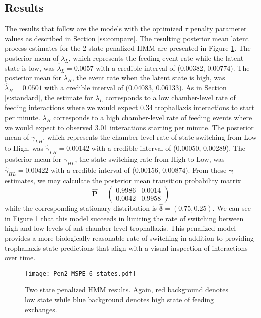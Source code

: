 \documentclass[smallextended]{svjour3}       %
\begin{document}
\subsection{Results}
The results that follow are the models with the optimized $\tau$ penalty parameter values as described in Section \ref{ss:compare}. The resulting posterior mean latent process estimates for the 2-state penalized HMM are presented in Figure \ref{f:penaltystates}. The posterior mean of $\lambda_L$, which represents the feeding event rate while the latent state is low, was $\hat{\lambda}_L = 0.0057$ with a credible interval of (0.00382, 0.00774). The posterior mean for $\lambda_H$, the event rate when the latent state is high, was $\hat{\lambda}_H = 0.0501$ with a credible interval of (0.04083, 0.06133). As in Section \ref{s:standard}, the estimate for $\lambda_L$ corresponds to a low chamber-level rate of feeding interactions where we would expect 0.34 trophallaxis interactions to start per minute. $\lambda_H$ corresponds to a high chamber-level rate of feeding events where we would expect to observed 3.01 interactions starting per minute. The posterior mean of $\gamma_{LH}$, which represents the chamber-level rate of state switching from Low to High, was $\hat{\gamma}_{LH} = 0.00142$  with a credible interval of (0.00050, 0.00289). The posterior mean for $\gamma_{HL}$, the state switching rate from High to Low, was $\hat{\gamma}_{HL} =  
0.00422 $ with a credible interval of (0.00156, 0.00874). From these $\bm{\gamma}$ estimates, we may calculate the posterior mean transition probability matrix 
\begin{equation}
\hat{\mathbf{P}} = \begin{pmatrix}
 0.9986 & 0.0014 \\
 0.0042 &   0.9958
\end{pmatrix}
\end{equation}
while the corresponding stationary distribution is $\hat{\bm{\delta}} = (0.75, 0.25)$. 
 We can see in Figure \ref{f:penaltystates} that  this model succeeds in limiting the rate of switching between high and low levels of ant chamber-level trophallaxis. This penalized model provides a more biologically reasonable rate of switching in addition to providing trophallaxis state predictions that align with a visual inspection of interactions over time. 
% 
\begin{figure}
 \centerline{\texttt{[image: Pen2\_MSPE-6\_states.pdf]}}
 \caption{Two state penalized HMM results. Again, red background denotes low state while blue background denotes high state of feeding exchanges.}
\label{f:penaltystates}
\end{figure}
\end{document}
